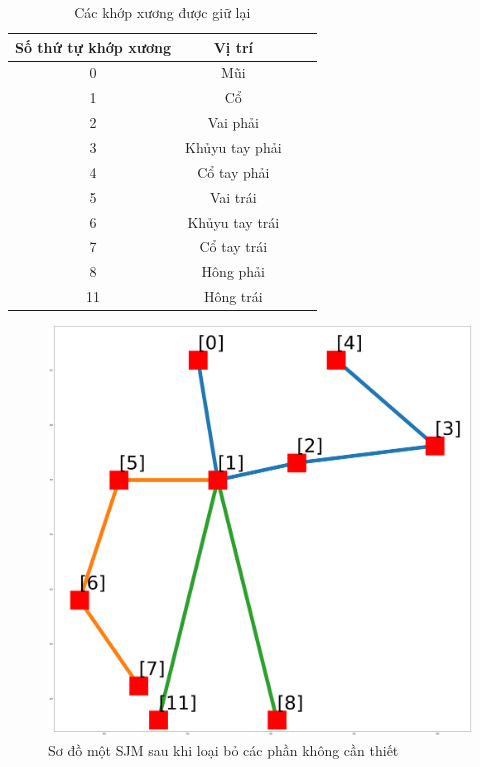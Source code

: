 \FloatBarrier
\begin{table}[h]
\caption{Các khớp xương được giữ lại}
\label{table:joints_choose}
\centering
\begin{center}
\begin{tabular}{|c|c||c|c|} 
 \hline
Số thứ tự khớp xương  & Vị trí \\
 \hline
 0 & Mũi\\
 \hline 
 1 & Cổ\\
 \hline 
 2 & Vai phải\\
 \hline
 3 & Khủyu tay phải \\
 \hline 
 4 & Cổ tay phải\\
 \hline
 5 & Vai trái\\
 \hline
 6 & Khủyu tay trái\\
 \hline
 7 & Cổ tay trái\\
 \hline
 8 & Hông phải\\
 \hline
 11 & Hông trái\\
 \hline
\end{tabular}
\end{center}
\end{table}


\begin{figure}[htp]
\begin{center}
\includegraphics[scale=0.11]{chap4/c4_figs/joints_choose_1.png}
\end{center}
\caption{Sơ đồ một SJM sau khi loại bỏ các phần không cần thiết}
\label{fig:joints}
\end{figure}
\FloatBarrier

